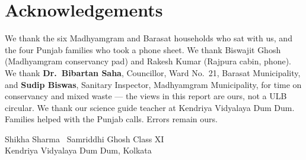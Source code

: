 \documentclass[12pt,a4paper]{article}
\begin{document}
\section{Acknowledgements}
We thank the six Madhyamgram and Barasat households who sat with us, and the four Punjab families who took a phone sheet. We thank Biswajit Ghosh (Madhyamgram conservancy pad) and Rakesh Kumar (Rajpura cabin, phone). We thank \textbf{Dr.\ Bibartan Saha}, Councillor, Ward No.~21, Barasat Municipality, and \textbf{Sudip Biswas}, Sanitary Inspector, Madhyamgram Municipality, for time on conservancy and mixed waste --- the views in this report are ours, not a ULB circular. We thank our science guide teacher at Kendriya Vidyalaya Dum Dum. Families helped with the Punjab calls. Errors remain ours.

\hfill Shikha Sharma \textbullet\ Samriddhi Ghosh \quad Class XI\\
\hfill Kendriya Vidyalaya Dum Dum, Kolkata
\end{document}
